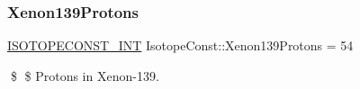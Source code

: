 \subsubsection{\texorpdfstring{Xenon139\+Protons}{Xenon139Protons}}
{\footnotesize\ttfamily \mbox{\hyperlink{group___isotope_const-_macros_ga5f18360b3e99483a35c32d789e62621c}{I\+S\+O\+T\+O\+P\+E\+C\+O\+N\+S\+T\+\_\+\+I\+NT}} Isotope\+Const\+::\+Xenon139\+Protons = 54}

\$ \$ Protons in Xenon-\/139. 